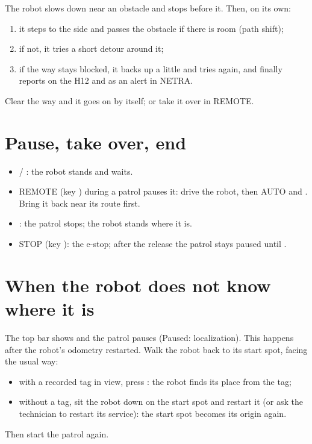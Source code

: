 The robot slows down near an obstacle and stops before it. Then, on its own:

\begin{enumerate}
  \item it steps to the side and passes the obstacle if there is room (path shift);
  \item if not, it tries a short detour around it;
  \item if the way stays blocked, it backs up a little and tries again, and finally reports
     on the H12 and as an alert in NETRA.
\end{enumerate}

Clear the way and it goes on by itself; or take it over in REMOTE.

\section{Pause, take over, end}

\begin{itemize}
  \item {} / : the robot stands and waits.
  \item REMOTE (key ) during a patrol pauses it: drive the robot, then AUTO and
    . Bring it back near its route first.
  \item {}: the patrol stops; the robot stands where it is.
  \item STOP (key ): the e-stop; after the release the patrol stays paused until
    .
\end{itemize}

\section{When the robot does not know where it is}

The top bar shows  and the patrol pauses (Paused: localization). This happens after
the robot's odometry restarted. Walk the robot back to its start spot, facing the usual way:

\begin{itemize}
  \item with a recorded tag in view, press : the robot finds its place from the tag;
  \item without a tag, sit the robot down on the start spot and restart it (or ask the technician
    to restart its service): the start spot becomes its origin again.
\end{itemize}

Then start the patrol again.
